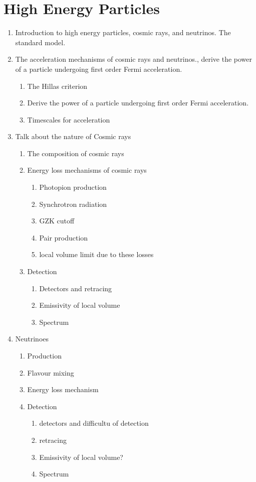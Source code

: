 \section{High Energy Particles}
\begin{enumerate}
    \item Introduction to high energy particles, cosmic rays, and neutrinos. The standard model. 
    \item The acceleration mechanisms of cosmic rays and neutrinos., derive the power of a particle undergoing first order Fermi acceleration.
    \begin{enumerate}
        \item The Hillas criterion
        \item Derive the power of a particle undergoing first order Fermi acceleration.
        \item Timescales for acceleration
    \end{enumerate}
    \item Talk about the nature of Cosmic rays
    \begin{enumerate}
        \item The composition of cosmic rays
        \item Energy loss mechanisms of cosmic rays
        \begin{enumerate}
            \item Photopion production
            \item Synchrotron radiation
            \item GZK cutoff
            \item Pair production
            \item local volume limit due to these losses
        \end{enumerate}
        \item Detection
        \begin{enumerate}
            \item Detectors and retracing
            \item Emissivity of local volume
            \item Spectrum
        \end{enumerate}
    \end{enumerate}
    \item Neutrinoes
    \begin{enumerate}
        \item Production 
        \item Flavour mixing
        \item Energy loss mechanism
        \item Detection
        \begin{enumerate}
            \item detectors and difficultu of detection
            \item retracing
            \item Emissivity of local volume? 
            \item Spectrum 
        \end{enumerate}
    \end{enumerate}

\end{enumerate}